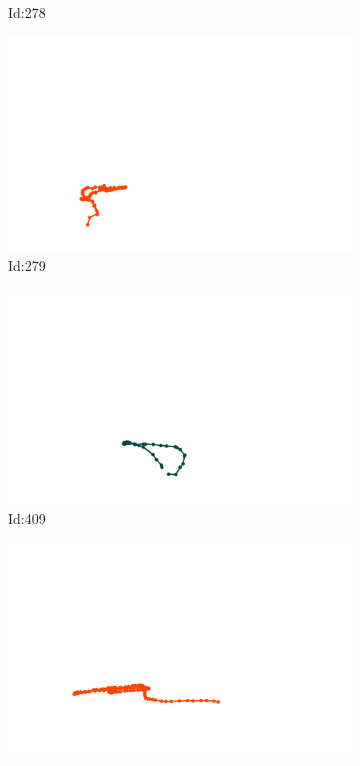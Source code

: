 \documentclass[12pt,twoside]{report}
\begin{document}
\begin{figure}
\begin{subfigure}[b]{0.20\textwidth}
\caption{Id:278}
\end{subfigure}
\begin{subfigure}[b]{0.20\textwidth}
\centering
\includegraphics[width=\textwidth]{../trajectories/279.png}
\caption{Id:279}
\end{subfigure}
\begin{subfigure}[b]{0.20\textwidth}
\centering
\includegraphics[width=\textwidth]{../trajectories/409.png}
\caption{Id:409}
\end{subfigure}
\begin{subfigure}[b]{0.20\textwidth}
\centering
\includegraphics[width=\textwidth]{../trajectories/412.png}

\end{subfigure}
\end{figure}
\end{document}
